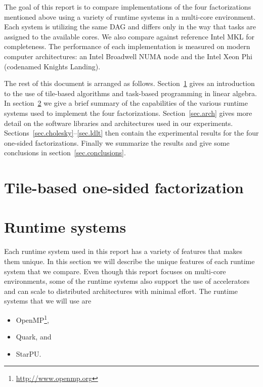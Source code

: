 \documentclass[a4paper,12pt]{article}
\begin{document}
The goal of this report is to compare implementations of
the four factorizations mentioned above
using a variety of runtime systems in a multi-core environment.
Each system is utilizing the same DAG and differs only in the way
that tasks are assigned to the available cores.
We also compare against reference Intel MKL
for completeness.
The performance of each implementation is measured
on modern computer architectures:
an Intel Broadwell NUMA node
and the Intel Xeon Phi (codenamed Knights Landing).

The rest of this document is arranged as follows.
Section~\ref{sec.tile} gives an introduction
to the use of tile-based algorithms and
task-based programming in linear algebra.
In section~\ref{sec.runtime_systems} we give a
brief summary of the capabilities of the various
runtime systems used to implement the four factorizations.
Section~\ref{sec.arch} gives more detail on the
software libraries and architectures used in our experiments.
Sections~\ref{sec.cholesky}--\ref{sec.ldlt} then
contain the experimental results for the four
one-sided factorizations.
Finally we summarize the results and give some conclusions
in section~\ref{sec.conclusions}.

\section{Tile-based one-sided factorization}
\label{sec.tile}




\section{Runtime systems}
\label{sec.runtime_systems}
Each runtime system used in this report has a variety of
features that makes them unique.
In this section we will describe the unique features of each runtime
system that we compare.
Even though this report focuses on multi-core environments,
some of the runtime systems also support the use of accelerators
and can scale to distributed architectures with
minimal effort.
The runtime systems that we will use are
\begin{itemize}
\item OpenMP\footnote{\url{http://www.openmp.org}},
\item Quark, and
\item StarPU.
\end{itemize}
\end{document}
